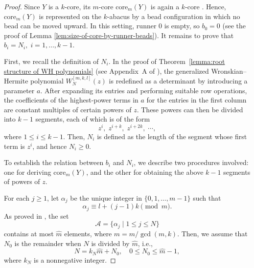\documentclass[preprint,3p,10pt]{elsarticle}
\theoremstyle{definition}
\begin{document}
\begin{proof}
Since \(Y\) is a \(k\)-core, its \(m\)-core \(\mathrm{core}_m(Y)\) is again a \(k\)-core \cite{gramain2012core}. Hence, \(\mathrm{core}_m(Y)\) is represented on the \(k\)-abacus by a bead configuration in which no bead can be moved upward. In this setting, runner \(0\) is empty, so \(b_0=0\) (see the proof of Lemma \ref{lem:size-of-core-by-runner-beads}). It remains to prove that $b_i=N_i,\; i=1,\dots,k-1.$

First, we recall the definition of \(N_i\). In the proof of Theorem~\ref{lemma:root structure of WH polynomials} (see Appendix~A of \cite{lin2024rogue}), the generalized Wronskian--Hermite polynomial \(W_N^{[m,k,l]}(z)\) is redefined as a determinant by introducing a parameter $a$. After expanding its entries and performing suitable row operations, the coefficients of the highest-power terms in \(a\) for the entries in the first column are constant multiples of certain powers of \(z\). These powers can then be divided into \(k-1\) segments, each of which is of the form
\begin{equation}
    z^i,\; z^{i+k},\; z^{i+2k},\; \cdots,
\end{equation}
where \(1\le i\le k-1\). Then, \(N_i\) is defined as the length of the segment whose first term is \(z^i\), and hence $N_i \ge 0$.

To establish the relation between \(b_i\) and \(N_i\), we describe two procedures involved: one for deriving \(\mathrm{core}_m(Y)\), and the other for obtaining the above \(k-1\) segments of powers of \(z\).

For each \(j\geq1\), let \(\alpha_j\) be the unique integer in
\(\{0,1,\ldots,m-1\}\) such that
\begin{equation}
    \alpha_j
    \equiv
    l+(j-1)k
    \pmod m.
\end{equation} 
As proved in \cite{lin2024rogue}, the set
\begin{equation}
    \mathcal A
    =
    \{\alpha_j\mid 1\leq j\leq N\}
\end{equation}
contains
at most \(\hat m\) elements, where $\hat m=m/\gcd(m,k)$.
Then, we assume that \(N_0\) is the remainder when \(N\) is divided by \(\hat{m}\), i.e.,
\begin{equation}
N = k_N \hat{m} + N_0, \quad 0 \le N_0 \le \hat{m}-1,
\end{equation}
where $k_N$ is a nonnegative integer. 


\end{proof}
\end{document}
